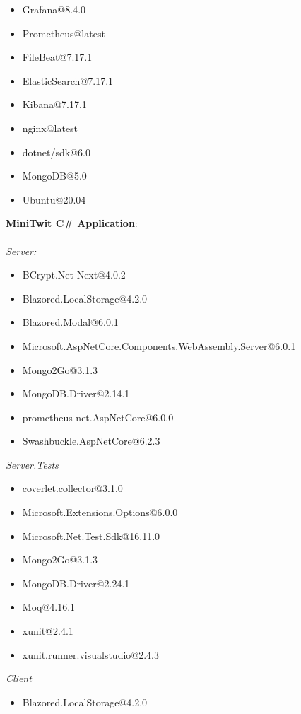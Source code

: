 \begin{enumerate}
\begin{itemize}
        \item Grafana@8.4.0
        \item Prometheus@latest
        
        \item FileBeat@7.17.1
        \item ElasticSearch@7.17.1
        \item Kibana@7.17.1
        \item nginx@latest
        
        \item dotnet/sdk@6.0
        \item MongoDB@5.0
        \item Ubuntu@20.04
    \end{itemize}
    \textbf{MiniTwit C\# Application}:\\\\
    \textit{Server:}
    \begin{itemize}
        \item BCrypt.Net-Next@4.0.2
        \item Blazored.LocalStorage@4.2.0
        \item Blazored.Modal@6.0.1
        \item Microsoft.AspNetCore.Components.WebAssembly.Server@6.0.1
        \item Mongo2Go@3.1.3
        \item MongoDB.Driver@2.14.1
        \item prometheus-net.AspNetCore@6.0.0
        \item Swashbuckle.AspNetCore@6.2.3
    \end{itemize}
    \textit{Server.Tests}
    \begin{itemize}
        \item coverlet.collector@3.1.0
        \item Microsoft.Extensions.Options@6.0.0
        \item Microsoft.Net.Test.Sdk@16.11.0
        \item Mongo2Go@3.1.3
        \item MongoDB.Driver@2.24.1
        \item Moq@4.16.1
        \item xunit@2.4.1
        \item xunit.runner.visualstudio@2.4.3
    \end{itemize}
    \textit{Client}
    \begin{itemize}
        \item Blazored.LocalStorage@4.2.0

\end{itemize}
\end{enumerate}
